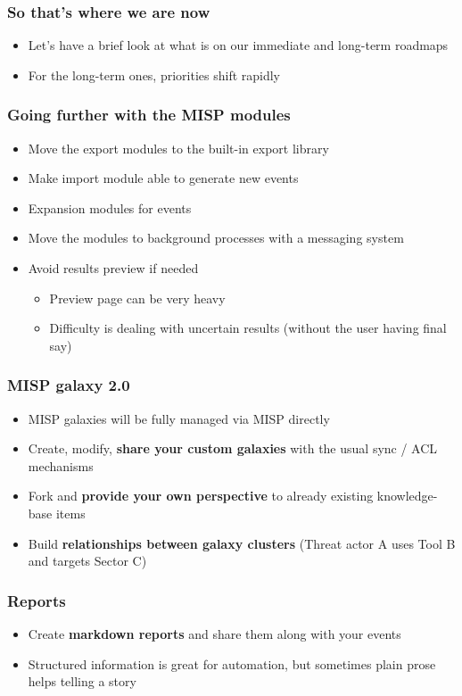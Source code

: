 \begin{frame}
\frametitle{So that's where we are now}
\begin{itemize}
	\item Let's have a brief look at what is on our immediate and long-term roadmaps
        \item For the long-term ones, priorities shift rapidly
\end{itemize}
\end{frame}

\begin{frame}
\frametitle{Going further with the MISP modules}
\begin{itemize}
    \item Move the export modules to the built-in export library
    \item Make import module able to generate new events
    \item Expansion modules for events
\end{itemize}
\begin{itemize}
    \item Move the modules to background processes with a
messaging system
    \item Avoid results preview if needed
    \begin{itemize}
        \item Preview page can be very heavy
        \item Difficulty is dealing with uncertain results (without the user
having final say)
    \end{itemize}
\end{itemize}
\end{frame}

\begin{frame}
\frametitle{MISP galaxy 2.0}
\begin{itemize}
	\item MISP galaxies will be fully managed via MISP directly
        \item Create, modify, {\bf share your custom galaxies} with the usual sync / ACL mechanisms
        \item Fork and {\bf provide your own perspective} to already existing knowledge-base items
        \item Build {\bf relationships between galaxy clusters} (Threat actor A uses Tool B and targets Sector C)
\end{itemize}
\end{frame}

\begin{frame}
\frametitle{Reports}
\begin{itemize}
	\item Create {\bf markdown reports} and share them along with your events
        \item Structured information is great for automation, but sometimes plain prose helps telling a story
\end{itemize}
\end{frame}

